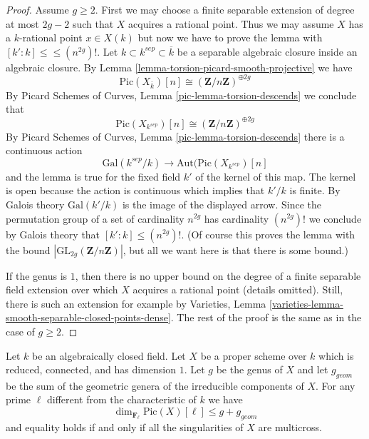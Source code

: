 \begin{proof}
Assume $g \geq 2$. First we may choose a finite separable extension
of degree at most $2g - 2$ such that $X$ acquires a rational point.
Thus we may assume $X$ has a $k$-rational point $x \in X(k)$
but now we have to prove the lemma with
$[k' : k] \leq \leq (n^{2g})!$.
Let $k \subset k^{sep} \subset \overline{k}$ be a separable algebraic
closure inside an algebraic closure.
By Lemma \ref{lemma-torsion-picard-smooth-projective} we have
$$
\text{Pic}(X_{\overline{k}})[n] \cong (\mathbf{Z}/n\mathbf{Z})^{\oplus 2g}
$$
By Picard Schemes of Curves, Lemma \ref{pic-lemma-torsion-descends}
we conclude that
$$
\text{Pic}(X_{k^{sep}})[n] \cong (\mathbf{Z}/n\mathbf{Z})^{\oplus 2g}
$$
By Picard Schemes of Curves, Lemma \ref{pic-lemma-torsion-descends}
there is a continuous action
$$
\text{Gal}(k^{sep}/k)
\longrightarrow
\text{Aut}(\text{Pic}(X_{k^{sep}})[n]
$$
and the lemma is true for the fixed field $k'$ of the kernel of this map.
The kernel is open because the action is continuous which implies
that $k'/k$ is finite. By Galois theory $\text{Gal}(k'/k)$
is the image of the displayed arrow. Since the permutation
group of a set of cardinality $n^{2g}$ has cardinality $(n^{2g})!$
we conclude by Galois theory that $[k' : k] \leq (n^{2g})!$.
(Of course this proves the lemma with the bound
$|\text{GL}_{2g}(\mathbf{Z}/n\mathbf{Z})|$, but all we want
here is that there is some bound.)

\medskip\noindent
If the genus is $1$, then there is no upper bound on the degree of a
finite separable field extension over which $X$ acquires a rational point
(details omitted). Still, there is such an extension for example by
Varieties, Lemma \ref{varieties-lemma-smooth-separable-closed-points-dense}.
The rest of the proof is the same as in the case of $g \geq 2$.
\end{proof}

\begin{proposition}
\label{proposition-torsion-picard-reduced-proper}
Let $k$ be an algebraically closed field. Let $X$ be a proper scheme over $k$
which is reduced, connected, and has dimension $1$. Let $g$ be the genus
of $X$ and let $g_{geom}$ be the sum of the geometric genera of the
irreducible components of $X$. For any prime $\ell$ different from
the characteristic of $k$ we have
$$
\dim_{\mathbf{F}_\ell} \text{Pic}(X)[\ell]
\leq g + g_{geom}
$$
and equality holds if and only if all the singularities of $X$
are multicross.
\end{proposition}

